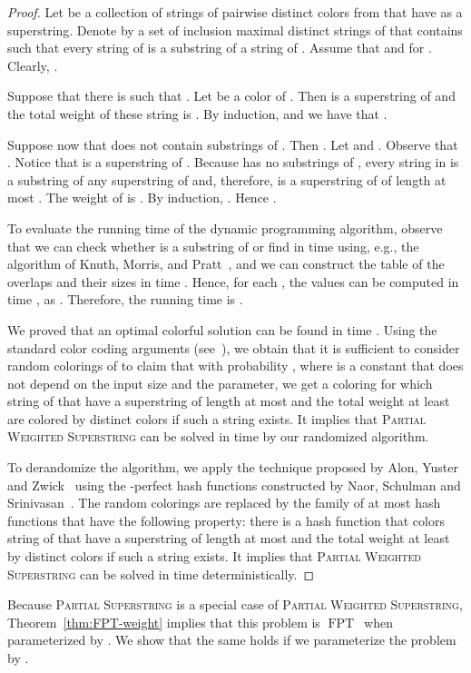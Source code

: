 \documentclass[11pt]{article}
\DeclareMathOperator{\operatorClassFPT}{FPT}
\newcommand{\classFPT}{\ensuremath{\operatorClassFPT}}
\begin{document}
\begin{proof}
Let  be a collection of  strings of pairwise distinct colors from  that have  as a superstring. Denote by  a set of inclusion maximal distinct strings of  that contains  such that every string of  is a substring of a string of . Assume that  and  for .
Clearly, . 

Suppose that there is  such that . Let  be a color of . Then  is a superstring of  and the total weight of these string is . By induction,  and we have that .

Suppose now that  does not contain substrings of . Then . Let  and .  Observe that .
Notice that  is a superstring of . 
Because  has no substrings of , every string in  is a substring of any superstring of   and, therefore,  is a superstring of  of length at most .  The weight of  is . By induction, 
. Hence .

To evaluate the running time of the dynamic programming algorithm, observe that we can check whether  is a substring of  or find  in time  using, e.g., the algorithm of Knuth, Morris, and Pratt~\cite{KnuthMP77}, 
and we can construct the table of the overlaps and their sizes in time . 
Hence, for each , the values  can be computed in time , as 
. 
Therefore, the running time is . 

We proved that an optimal colorful solution can be found in time  . Using the standard color coding arguments (see~\cite{AlonYZ95}), we obtain that it is sufficient to consider  random colorings of  to claim that with probability , where  is a constant that does not depend on the input size and the parameter, we get a coloring for which  string of  that have a superstring of length at most  and the total weight at least  are colored by distinct colors if such a string exists.  It implies that 
\textsc{Partial Weighted Superstring} can be solved  
in time  by  our randomized algorithm.

To derandomize the algorithm, we apply the  technique proposed by Alon, Yuster and Zwick~\cite{AlonYZ95}
using the -perfect hash functions constructed by Naor, Schulman and Srinivasan~\cite{NaorSS95}. 
The random colorings are replaced by the family of at most  hash functions  that have the following property:
there is a hash function  that colors 
 string of  that have a superstring of length at most  and the total weight at least  by distinct colors if such a string exists.
It implies that \textsc{Partial Weighted Superstring} can be solved in time  deterministically.
\end{proof}

Because \textsc{Partial Superstring} is a special case of \textsc{Partial Weighted Superstring}, Theorem~\ref{thm:FPT-weight} implies that this problem is \classFPT\ when parameterized by . We show that the same holds if we parameterize the problem by .
\end{document}
